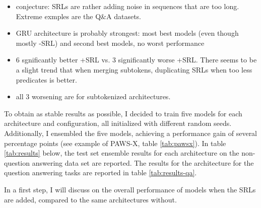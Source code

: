 \begin{itemize}
  \item conjecture: SRLs are rather adding noise in sequences that are too long. Extreme exmples are the Q\&A datasets.
  \item GRU architecture is probably strongest: most best models (even though mostly -SRL) and second best models, no worst performance
  \item 6 sgnificantly better +SRL vs. 3 significantly worse +SRL. There seems to be a slight trend that when merging subtokens, duplicating SRLs when too less predicates is better.
  \item all 3 worsening are for subtokenized architectures.
\end{itemize}

To obtain as stable results as possible, I decided to train five models for each architecture
and configuration, all initialized with different random seeds. Additionally, I ensembled the
five models, achieving a performance gain of several percentage points (see example of PAWS-X,
table \ref{tab:pawsx}). In table \ref{tab:results} below, the test set ensemble results for
each architecture on the non-question answering data set are reported. The results for the
architecture for the question answering tasks are reported in table \ref{tab:results-qa}.

In a first step, I will discuss on the overall performance of models when the SRLs are added, compared to the same architectures without.


